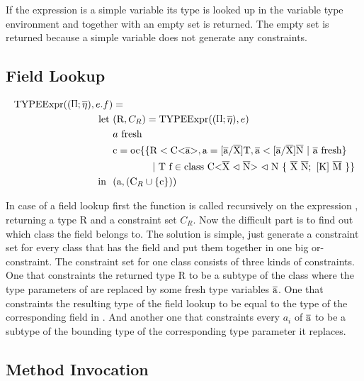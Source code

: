 If the expression is a simple variable its type is looked up in the variable type environment and together with an empty set is returned. The empty set is returned because a simple variable does not generate any constraints.

\subsection{Field Lookup}

\begin{align*}
    \texpr{e.f} &= \\
    \text{let} \ &( \text{R}, C_R ) = \texpr{e} \\
    &\fresh{a} \\
    &\text{c} = \text{oc} \{ \{ \text{R} < \text{C<} \ot{a} \text{>}, \text{a} = \tsxsn{a}{X}{T}, \ot{a} < \tsxsns{a}{X}{N} \ | \ \fresh{\ot{a}} \} \\
    & \quad \quad \quad \quad | \ \text{T f} \in \class{X}{N} \}\\
    \text{in} \ \ & (\text{a}, (\text{C}_R \cup \{ \text{c} \} ))
\end{align*}

In case of a field lookup  first the  function is called recursively on the expression , returning a
type R and a constraint set $C_R$. Now the difficult part is to find out which class the field  belongs to. The solution is simple,
just generate a constraint set for every class  that has the field  and put them together in one big or-constraint.
The constraint set for one class consists of three kinds of constraints. One that constraints the returned type R to be a subtype
of the class  where the type parameters of  are replaced by some fresh type variables $\overline{\text{a}}$. One that constraints the resulting type of the field lookup
to be equal to the type of the corresponding field in . And another one that constraints every $a_i$ of $\overline{\text{a}}$ to be a subtype of the bounding type of the corresponding type parameter it replaces.

\subsection{Method Invocation}


